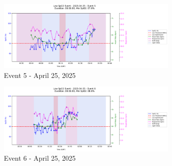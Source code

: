 \documentclass{article}
\begin{document}
\begin{figure}[htbp]
    \centering
    \includegraphics[width=0.8\textwidth]{images/2025-04-25_event_5.png}
    \caption{Event 5 - April 25, 2025}
\end{figure}
\begin{figure}[htbp]
    \centering
    \includegraphics[width=0.8\textwidth]{images/2025-04-25_event_6.png}
    \caption{Event 6 - April 25, 2025}
\end{figure}
\clearpage
\end{document}

